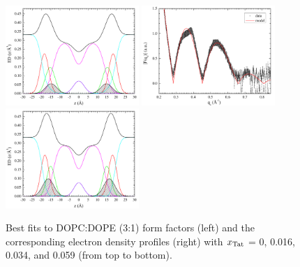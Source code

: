 \begin{figure}[htbp]
  \includegraphics[width=0.45\textwidth,valign=t]{./figures/Tat/SDP_Results/EDP/DOPCDOPE3to1_Tat_28to1_3p0_EDP1}
  \includegraphics[width=0.45\textwidth,valign=t]{figures/Tat/SDP_Results/XFF/DOPCDOPE3to1_Tat_16to1_3p0_XFF1}
  \includegraphics[width=0.45\textwidth,valign=t]{./figures/Tat/SDP_Results/EDP/DOPCDOPE3to1_Tat_16to1_3p0_EDP1}
  \caption{Best fits to DOPC:DOPE (3:1) form factors (left) and the corresponding 
  electron density profiles (right) with $x_\textrm{Tat}$ = 0, 0.016, 0.034, 
  and 0.059 (from top to bottom).}
  \label{fig:DOPCDOPE3to1_Tat_XFF1}
\end{figure}

